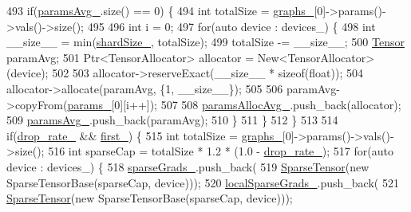 \begin{DoxyCode}
493         \textcolor{keywordflow}{if}(\hyperlink{classmarian_1_1AsyncGraphGroup_a203413621a666e7e5c9394a3a02498f4}{paramsAvg\_}.size() == 0) \{
494           \textcolor{keywordtype}{int} totalSize = \hyperlink{classmarian_1_1AsyncGraphGroup_a3fbad41763c988a5723a39c2220287d8}{graphs\_}[0]->params()->vals()->size();
495 
496           \textcolor{keywordtype}{int} i = 0;
497           \textcolor{keywordflow}{for}(\textcolor{keyword}{auto} device : devices\_) \{
498             \textcolor{keywordtype}{int} \_\_size\_\_ = min(\hyperlink{classmarian_1_1AsyncGraphGroup_a3af39dcadc6a7f84a4a906f2048fd420}{shardSize\_}, totalSize);
499             totalSize -= \_\_size\_\_;
500             \hyperlink{namespacemarian_a88b71ec34bb354564cddc24eb80f7e14}{Tensor} paramAvg;
501             Ptr<TensorAllocator> allocator = New<TensorAllocator>(device);
502 
503             allocator->reserveExact(\_\_size\_\_ * \textcolor{keyword}{sizeof}(\textcolor{keywordtype}{float}));
504             allocator->allocate(paramAvg, \{1, \_\_size\_\_\});
505 
506             paramAvg->copyFrom(\hyperlink{classmarian_1_1AsyncGraphGroup_ad1bf15e55cc12b90d39012303b14767b}{params\_}[0][i++]);
507 
508             \hyperlink{classmarian_1_1AsyncGraphGroup_af6fd0e5be552825e8190fcb17fe63671}{paramsAllocAvg\_}.push\_back(allocator);
509             \hyperlink{classmarian_1_1AsyncGraphGroup_a203413621a666e7e5c9394a3a02498f4}{paramsAvg\_}.push\_back(paramAvg);
510           \}
511         \}
512       \}
513 
514       \textcolor{keywordflow}{if}(\hyperlink{classmarian_1_1AsyncGraphGroup_a774969ba69bab8fbd48e6454bbe7e54c}{drop\_rate\_} && \hyperlink{classmarian_1_1AsyncGraphGroup_af89976e48b8e21119bbf66ea7bc23d96}{first\_}) \{
515         \textcolor{keywordtype}{int} totalSize = \hyperlink{classmarian_1_1AsyncGraphGroup_a3fbad41763c988a5723a39c2220287d8}{graphs\_}[0]->params()->vals()->size();
516         \textcolor{keywordtype}{int} sparseCap = totalSize * 1.2 * (1.0 - \hyperlink{classmarian_1_1AsyncGraphGroup_a774969ba69bab8fbd48e6454bbe7e54c}{drop\_rate\_});
517         \textcolor{keywordflow}{for}(\textcolor{keyword}{auto} device : devices\_) \{
518           \hyperlink{classmarian_1_1AsyncGraphGroup_a8270ea17d3e0ad0288686ecf8680b761}{sparseGrads\_}.push\_back(
519               \hyperlink{namespacemarian_a5484064f1fce2661d0b27a5c02a9392b}{SparseTensor}(\textcolor{keyword}{new} SparseTensorBase(sparseCap, device)));
520           \hyperlink{classmarian_1_1AsyncGraphGroup_a29422f1a8b9a8e2cc732101a34557b61}{localSparseGrads\_}.push\_back(
521               \hyperlink{namespacemarian_a5484064f1fce2661d0b27a5c02a9392b}{SparseTensor}(\textcolor{keyword}{new} SparseTensorBase(sparseCap, device)));

\end{DoxyCode}
